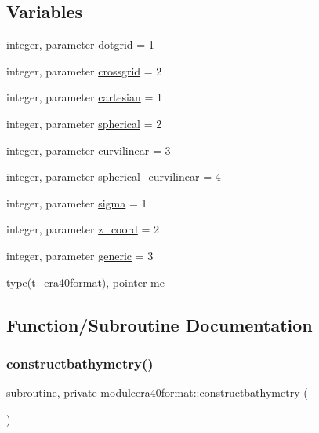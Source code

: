 \subsection*{Variables}
\begin{DoxyCompactItemize}
\item 
integer, parameter \mbox{\hyperlink{namespacemoduleera40format_a8abaf8c6f9802ba0e7e994aa019dbfd9}{dotgrid}} = 1
\item 
integer, parameter \mbox{\hyperlink{namespacemoduleera40format_a81534a4bbb190281637fa42199fb3c9e}{crossgrid}} = 2
\item 
integer, parameter \mbox{\hyperlink{namespacemoduleera40format_a42e5afd967f2051f48175fd48cbcaeab}{cartesian}} = 1
\item 
integer, parameter \mbox{\hyperlink{namespacemoduleera40format_ad0e35072a96590a2ebaa186af57b70e2}{spherical}} = 2
\item 
integer, parameter \mbox{\hyperlink{namespacemoduleera40format_ad3784d422598dc6566016fdb9451fd5d}{curvilinear}} = 3
\item 
integer, parameter \mbox{\hyperlink{namespacemoduleera40format_a0193f3c82de3eb7dc7ce15df95940bb5}{spherical\+\_\+curvilinear}} = 4
\item 
integer, parameter \mbox{\hyperlink{namespacemoduleera40format_a79506ec89444ea59431e76f12f1daf20}{sigma}} = 1
\item 
integer, parameter \mbox{\hyperlink{namespacemoduleera40format_ae4ff4503bcd3d89b98e392ca67b2ef13}{z\+\_\+coord}} = 2
\item 
integer, parameter \mbox{\hyperlink{namespacemoduleera40format_aa7e1f8ccfef24db2e6226011a47b2b88}{generic}} = 3
\item 
type(\mbox{\hyperlink{structmoduleera40format_1_1t__era40format}{t\+\_\+era40format}}), pointer \mbox{\hyperlink{namespacemoduleera40format_a991250a617c86efee2eeaeecf12cee05}{me}}
\end{DoxyCompactItemize}


\subsection{Function/\+Subroutine Documentation}
\mbox{\label{namespacemoduleera40format_a73e47fa652795fc4885fa7d6a5c34503}} 
\subsubsection{\texorpdfstring{constructbathymetry()}{constructbathymetry()}}
{\footnotesize\ttfamily subroutine, private moduleera40format\+::constructbathymetry (\begin{DoxyParamCaption}{ }\end{DoxyParamCaption})\hspace{0.3cm}{\ttfamily [private]}}


